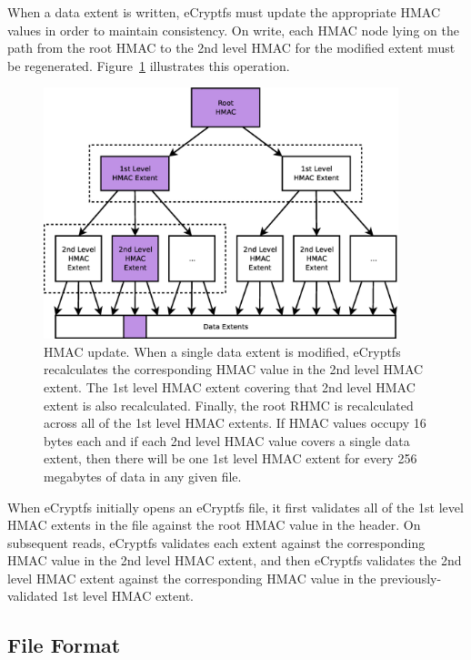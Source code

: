 \documentclass{article}
\begin{document}
When a data extent is written, eCryptfs must update the appropriate
HMAC values in order to maintain consistency. On write, each HMAC node
lying on the path from the root HMAC to the 2nd level HMAC for the
modified extent must be regenerated. Figure~\ref{hmac_tree_update}
illustrates this operation.

\begin{figure}[t]
  \begin{center}
    \includegraphics[width=0.92\textwidth]{hmac_tree_update}
    \caption{HMAC update. When a single data extent is modified,
    eCryptfs recalculates the corresponding HMAC value in the 2nd
    level HMAC extent. The 1st level HMAC extent covering that 2nd
    level HMAC extent is also recalculated. Finally, the root RHMC is
    recalculated across all of the 1st level HMAC extents. If HMAC
    values occupy 16 bytes each and if each 2nd level HMAC value
    covers a single data extent, then there will be one 1st level HMAC
    extent for every 256 megabytes of data in any given file.}
    \label{hmac_tree_update}
  \end{center}
\end{figure}

When eCryptfs initially opens an eCryptfs file, it first validates all
of the 1st level HMAC extents in the file against the root HMAC value
in the header. On subsequent reads, eCryptfs validates each extent
against the corresponding HMAC value in the 2nd level HMAC extent, and
then eCryptfs validates the 2nd level HMAC extent against the
corresponding HMAC value in the previously-validated 1st level HMAC
extent.

\subsection{File Format}
\end{document}
